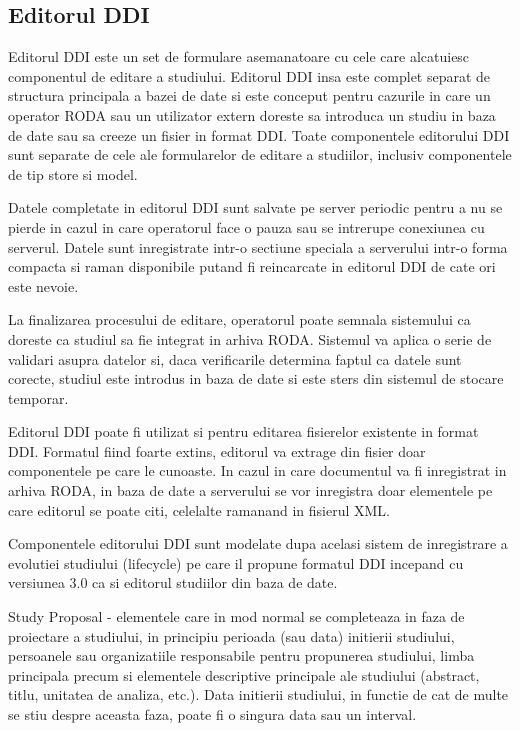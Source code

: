 \subsection{Editorul DDI}


Editorul DDI este un set de formulare asemanatoare cu cele care alcatuiesc componentul de editare a studiului. Editorul DDI insa este complet separat de structura principala a bazei de date si este conceput pentru cazurile in care un operator RODA sau un utilizator extern doreste sa introduca un studiu in baza de date sau sa creeze un fisier in format DDI. Toate componentele editorului DDI sunt separate de cele ale formularelor de editare a studiilor, inclusiv componentele de tip store si model. 

Datele completate in editorul DDI sunt salvate pe server periodic pentru a nu se pierde in cazul in care operatorul face o pauza sau se intrerupe conexiunea cu serverul. Datele sunt inregistrate intr-o sectiune speciala a serverului intr-o forma compacta si raman disponibile putand fi reincarcate in editorul DDI de cate ori este nevoie. 

La finalizarea procesului de editare, operatorul poate semnala sistemului ca doreste ca studiul sa fie integrat in arhiva RODA. Sistemul va aplica o serie de validari asupra datelor si, daca verificarile determina faptul ca datele sunt corecte, studiul este introdus in baza de date si este sters din sistemul de stocare temporar. 

Editorul DDI poate fi utilizat si pentru editarea fisierelor existente in format DDI. Formatul fiind foarte extins, editorul va extrage din fisier doar componentele pe care le cunoaste. In cazul in care documentul va fi inregistrat in arhiva RODA, in baza de date a serverului se vor inregistra doar elementele pe care editorul se poate citi, celelalte ramanand in fisierul XML. 

Componentele editorului DDI sunt modelate dupa acelasi sistem de inregistrare a evolutiei studiului (lifecycle) pe care il propune formatul DDI incepand cu versiunea 3.0 ca si editorul studiilor din baza de date. 

Study Proposal - elementele care in mod normal se completeaza in faza de proiectare a studiului, in principiu perioada (sau data) initierii studiului, persoanele sau organizatiile responsabile pentru propunerea studiului, limba principala precum si elementele descriptive principale ale studiului (abstract, titlu, unitatea de analiza, etc.). Data initierii studiului, in functie de cat de multe se stiu despre aceasta faza, poate fi o singura data sau un interval.


